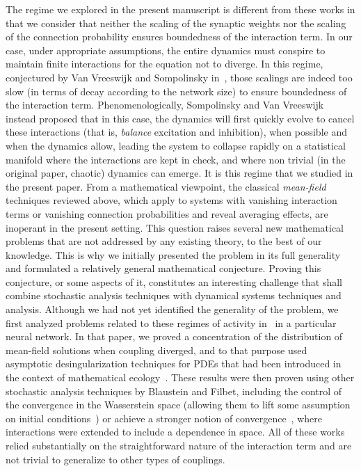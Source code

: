 \documentclass[onefignum,onetabnum]{siamart190516}
\newcommand{\1}{\mathbbm{1}}
\newcommand{\review}[1]{\textcolor{midblue}{ #1}}
\renewcommand{\review}[1]{{ #1}}
\begin{document}
\review{ The regime we explored in the present manuscript is different from these works in that we consider that neither the scaling of the synaptic weights nor the scaling of the connection probability ensures boundedness of the interaction term. In our case, under appropriate assumptions, the entire dynamics must conspire to maintain finite interactions for the equation not to diverge. In this regime, conjectured by Van Vreeswijk and Sompolinsky in~\cite{vreeswijk1998chaotic}, those scalings are indeed too slow (in terms of decay according to the network size) to ensure boundedness of the interaction term. Phenomenologically, Sompolinsky and Van Vreeswijk instead proposed that in this case, the dynamics will first quickly evolve to cancel these interactions (that is, \emph{balance} excitation and inhibition), when possible and when the dynamics allow, leading the system to collapse rapidly on a statistical manifold where the interactions are kept in check, and where non trivial (in the original paper, chaotic) dynamics can emerge. It is this regime that we studied in the present paper. From a mathematical viewpoint, the classical \emph{mean-field} techniques reviewed above, which apply to systems with vanishing interaction terms or vanishing connection probabilities and reveal averaging effects, are inoperant in the present setting. This question raises several new mathematical problems that are not addressed by any existing theory, to the best of our knowledge. This is why we initially presented the problem in its full generality and formulated a relatively general mathematical conjecture. Proving this conjecture, or some aspects of it, constitutes an interesting challenge that shall combine stochastic analysis techniques with dynamical systems techniques and analysis. Although we had not yet identified the generality of the problem, we first analyzed problems related to these regimes of activity in~\cite{quininao2020clamping} in a particular neural network. In that paper, we proved a concentration of the distribution of mean-field solutions when coupling diverged, and to that purpose used asymptotic desingularization techniques for PDEs that had been introduced in the context of mathematical ecology~\cite{barles2009concentration,barles2002geometrical,mirrahimi2015uniqueness,bouin2013hamilton,lorz2011dirac}. These results were then proven using other stochastic analysis techniques by Blaustein and Filbet, including the control of the convergence in the Wasserstein space (allowing them to lift some assumption on initial conditions~\cite{blaustein2023concentration}) or achieve a stronger notion of convergence~\cite{blaustein2023large}, where interactions were extended to include a dependence in space. All of these works relied substantially on the straightforward nature of the interaction term and are not trivial to generalize to other types of couplings. }
\end{document}
